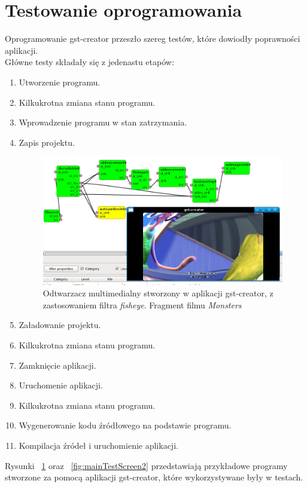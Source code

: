 \documentclass[12pt]{article}
\begin{document}
\section{Testowanie oprogramowania}
Oprogramowanie gst-creator przeszło szereg testów, które dowiodły poprawności aplikacji.\\
Główne testy składały się z jedenastu etapów:
\begin{enumerate}
  \setlength{\itemsep}{0em}
\item Utworzenie programu.
\item Kilkukrotna zmiana stanu programu.
\item Wprowadzenie programu w stan zatrzymania.
\item Zapis projektu.
\begin{figure}[H]
  \includegraphics[width=160mm]{img/main-test-screen1.png}
  \caption{Odtwarzacz multimedialny stworzony w aplikacji gst-creator, z zastosowaniem filtra \textit{fisheye}. Fragment filmu \textit{Monsters} \cite{monstersDownloadPage}}
  \label{fig:mainTestScreen1}
\end{figure}
\item Załadowanie projektu. 
\item Kilkukrotna zmiana stanu programu.
\item Zamknięcie aplikacji.
\item Uruchomenie aplikacji.
\item Kilkukrotna zmiana stanu programu.
\item Wygenerowanie kodu źródłowego na podstawie programu.
\item Kompilacja źródeł i uruchomienie aplikacji.
\end{enumerate}
Rysunki ~\ref{fig:mainTestScreen1} oraz ~\ref{fig:mainTestScreen2} przedstawiają przykładowe programy stworzone za pomocą aplikacji gst-creator, które wykorzystywane były w testach.
\end{document}
